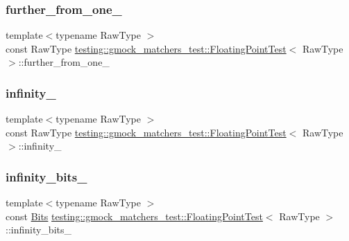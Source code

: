 \subsubsection{\texorpdfstring{further\_from\_one\_}{further\_from\_one\_}}
{\footnotesize\ttfamily template$<$typename Raw\+Type $>$ \\
const Raw\+Type \mbox{\hyperlink{classtesting_1_1gmock__matchers__test_1_1FloatingPointTest}{testing\+::gmock\+\_\+matchers\+\_\+test\+::\+Floating\+Point\+Test}}$<$ Raw\+Type $>$\+::further\+\_\+from\+\_\+one\+\_\+\hspace{0.3cm}{\ttfamily [protected]}}

\mbox{\label{classtesting_1_1gmock__matchers__test_1_1FloatingPointTest_a21d8a019a6365ddff80e301a6163f43f}} 
\subsubsection{\texorpdfstring{infinity\_}{infinity\_}}
{\footnotesize\ttfamily template$<$typename Raw\+Type $>$ \\
const Raw\+Type \mbox{\hyperlink{classtesting_1_1gmock__matchers__test_1_1FloatingPointTest}{testing\+::gmock\+\_\+matchers\+\_\+test\+::\+Floating\+Point\+Test}}$<$ Raw\+Type $>$\+::infinity\+\_\+\hspace{0.3cm}{\ttfamily [protected]}}

\mbox{\label{classtesting_1_1gmock__matchers__test_1_1FloatingPointTest_a3c25f403d51e6c8ed3fe7856cab1330b}} 
\subsubsection{\texorpdfstring{infinity\_bits\_}{infinity\_bits\_}}
{\footnotesize\ttfamily template$<$typename Raw\+Type $>$ \\
const \mbox{\hyperlink{classtesting_1_1gmock__matchers__test_1_1FloatingPointTest_addf899bd832ae51103198d201d2f2ea2}{Bits}} \mbox{\hyperlink{classtesting_1_1gmock__matchers__test_1_1FloatingPointTest}{testing\+::gmock\+\_\+matchers\+\_\+test\+::\+Floating\+Point\+Test}}$<$ Raw\+Type $>$\+::infinity\+\_\+bits\+\_\+\hspace{0.3cm}{\ttfamily [protected]}}

